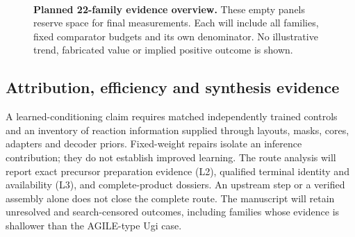 \begin{figure}[H]
\centering
{}\hfill
{}\\[6pt]
\hfill
{}
\caption{\textbf{Planned 22-family evidence overview.} These empty panels reserve space for final
measurements. Each will include all families, fixed comparator budgets and its own denominator.
No illustrative trend, fabricated value or implied positive outcome is shown.}
\label{fig:22-overview}
\end{figure}

\subsection{Attribution, efficiency and synthesis evidence}
A learned-conditioning claim requires matched independently trained controls and an inventory of
reaction information supplied through layouts, masks, cores, adapters and decoder priors. Fixed-weight
repairs isolate an inference contribution; they do not establish improved learning. The route analysis
will report exact precursor preparation evidence (L2), qualified terminal identity and availability
(L3), and complete-product dossiers. An upstream step or a verified assembly alone does not close
the complete route. The manuscript will retain unresolved and search-censored outcomes, including
families whose evidence is shallower than the AGILE-type Ugi case.
